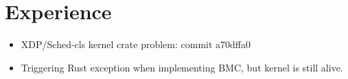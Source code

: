 \section{Experience}
\begin{itemize}
    \item XDP/Sched-cls kernel crate problem: commit a70dffa0
    \item Triggering Rust exception when implementing BMC, but kernel is still
        alive.
\end{itemize}